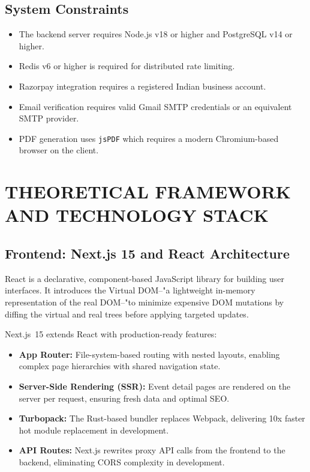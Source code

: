 \documentclass[12pt,a4paper]{report}
\begin{document}
\section{System Constraints}
\begin{itemize}[leftmargin=2em]
    \item The backend server requires Node.js v18 or higher and PostgreSQL v14 or higher.
    \item Redis v6 or higher is required for distributed rate limiting.
    \item Razorpay integration requires a registered Indian business account.
    \item Email verification requires valid Gmail SMTP credentials or an equivalent SMTP provider.
    \item PDF generation uses \texttt{jsPDF} which requires a modern Chromium-based browser on the client.
\end{itemize}

\chapter{THEORETICAL FRAMEWORK AND TECHNOLOGY STACK}

\section{Frontend: Next.js 15 and React Architecture}
React is a declarative, component-based JavaScript library for building user interfaces. It introduces the Virtual DOM--"a lightweight in-memory representation of the real DOM--"to minimize expensive DOM mutations by diffing the virtual and real trees before applying targeted updates.

Next.js~15 extends React with production-ready features:
\begin{itemize}[leftmargin=2em]
    \item \textbf{App Router:} File-system-based routing with nested layouts, enabling complex page hierarchies with shared navigation state.
    \item \textbf{Server-Side Rendering (SSR):} Event detail pages are rendered on the server per request, ensuring fresh data and optimal SEO.
    \item \textbf{Turbopack:} The Rust-based bundler replaces Webpack, delivering 10x faster hot module replacement in development.
    \item \textbf{API Routes:} Next.js rewrites proxy API calls from the frontend to the backend, eliminating CORS complexity in development.
\end{itemize}
\end{document}
